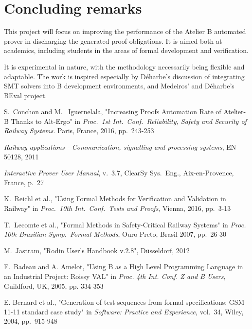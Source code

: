 \documentclass[11pt,journal]{IEEEtran}
\begin{document}
	\section{Concluding remarks}
	This project will focus on improving the performance of the Atelier B automated prover in discharging the generated proof obligations. It is aimed both at academics, including students in the areas of formal development and verification.
	
	It is experimental in nature, with the methodology necessarily being flexible and adaptable. The work is inspired especially by D\'{e}harbe's discussion of integrating SMT solvers into B development environments, and Medeiros' and D\'{e}harbe's BEval project.
	
	\IEEEPARstart{}{} 
	
	\begin{thebibliography}{1}
		S.~Conchon and M.~ Iguernelala, "Increasing Proofs Automation Rate of Atelier-B Thanks to Alt-Ergo" in \emph{Proc.~1st Int.~Conf.~Reliability, Safety and Security of Railway Systems}. Paris, France, 2016, pp.~243-253
		
		\emph{Railway applications - Communication, signalling and processing systems}, EN 50128, 2011
		
		\emph{Interactive Prover User Manual}, v.~3.7, ClearSy Sys.~Eng., Aix-en-Provence, France, p.~27
		
		K.~Reichl et al., "Using Formal Methods for Verification and Validation in Railway" in \emph{Proc.~10th Int.~Conf.~Tests and Proofs}, Vienna, 2016, pp.~3-13
		
		T.~Lecomte et al., "Formal Methods in Safety-Critical Railway Systems" in \emph{Proc. 10th Brazilian Symp.~Formal Methods}, Ouro Preto, Brasil 2007, pp.~26-30
		
		M.~Jastram, "Rodin User's Handbook v.2.8", D\"{u}sseldorf, 2012
		
		F.~Badeau and A. Amelot, "Using B as a High Level Programming Language in an Industrial Project: Roissy VAL" in \emph{Proc. 4th Int. Conf. Z and B Users}, Guildford, UK, 2005, pp. 334-353
		
		E. Bernard et al., "Generation of test sequences from formal specifications: GSM 11-11 standard case study" in \emph{Software: Practice and Experience}, vol.~34, Wiley, 2004, pp.~915-948
		

\end{thebibliography}
\end{document}
